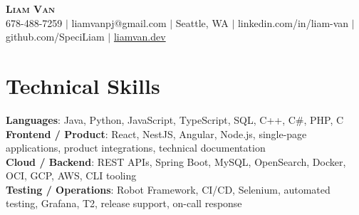\documentclass[letterpaper,11pt]{article}
\begin{document}

%
\begin{center}
    \textbf{\Huge \scshape Liam Van} \\ \vspace{1pt}
    \small 678-488-7259 $|$ \small {liamvanpj@gmail.com} $|$ Seattle, WA
 {{$|$ linkedin.com/in/liam-van} {$|$ github.com/SpeciLiam} {$|$ \href{https://liamvan.dev}{liamvan.dev}}}

\end{center}

\section{Technical Skills}
 \begin{itemize}[leftmargin=0.15in, label={}]
    \small{\item{
     \textbf{Languages}{: Java, Python, JavaScript, TypeScript, SQL, C++, C\#, PHP, C} \\
     \textbf{Frontend / Product}{: React, NestJS, Angular, Node.js, single-page applications, product integrations, technical documentation} \\
     \textbf{Cloud / Backend}{: REST APIs, Spring Boot, MySQL, OpenSearch, Docker, OCI, GCP, AWS, CLI tooling} \\
     \textbf{Testing / Operations}{: Robot Framework, CI/CD, Selenium, automated testing, Grafana, T2, release support, on-call response} \\
    }}
 \end{itemize}
%
\end{document}

